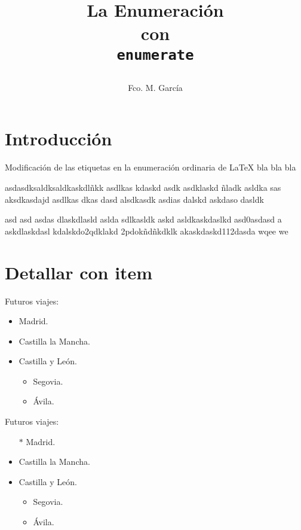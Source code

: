 \documentclass[12pt,
              ]{article}
\title
{
\HRule
\begin{flushright}
\Huge
\textbf{La Enumeración}\\[3mm]
\Large
\textbf{con}\\
\Huge
\texttt{enumerate}
\end{flushright}
\HRule 
}
\author{\large Fco. M. García}
\begin{document}
\maketitle

\tableofcontents %

\setcounter{section}{-1}

\section{Introducción}


  Modificación de las etiquetas en la enumeración ordinaria de
  {\LaTeX} bla bla bla
  
  asdasdksaldksaldkaskdlñkk asdlkas kdaskd asdk asdklaskd ñladk asldka sas
  aksdkasdajd asdlkas dkas dasd alsdkasdk asdias dalskd askdaso dasldk 
  
  asd asd asdas dlaskdlasld aslda sdlkasldk askd asldkaskdaslkd asd0asdasd a
  askdlaskdasl kdalskdo2qdklakd 2pdokñdñkdklk akaskdaskd112dasda wqee we

\section{Detallar con item}

Futuros viajes:

\begin{itemize}
    \item Madrid.
    \item Castilla la Mancha.
    \item Castilla y León.
    \begin{itemize}
         \item Segovia.
         \item Ávila.
    \end{itemize}
\end{itemize}

\renewcommand{\labelitemi}{$-$}
\renewcommand{\labelitemii}{$\cdot$}

Futuros viajes:

\begin{itemize}
    \item[$*$] Madrid.
    \item Castilla la Mancha.
    \item Castilla y León.
    \begin{itemize}
        \item Segovia.
        \item Ávila.
    \end{itemize}
\end{itemize}
\end{document}
